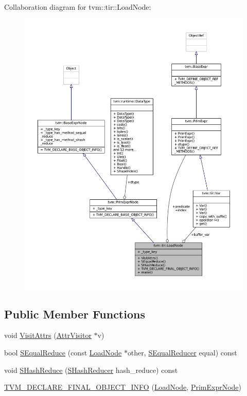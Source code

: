 Collaboration diagram for tvm\+:\+:tir\+:\+:Load\+Node\+:
\nopagebreak
\begin{figure}[H]
\begin{center}
\leavevmode
\includegraphics[width=350pt]{classtvm_1_1tir_1_1LoadNode__coll__graph}
\end{center}
\end{figure}
\subsection*{Public Member Functions}
\begin{DoxyCompactItemize}
\item 
void \hyperlink{classtvm_1_1tir_1_1LoadNode_acc4597323aba2761dafaf9a24bb4c0e4}{Visit\+Attrs} (\hyperlink{classtvm_1_1AttrVisitor}{Attr\+Visitor} $\ast$v)
\item 
bool \hyperlink{classtvm_1_1tir_1_1LoadNode_adbc71528163b57582a742224be58d15c}{S\+Equal\+Reduce} (const \hyperlink{classtvm_1_1tir_1_1LoadNode}{Load\+Node} $\ast$other, \hyperlink{classtvm_1_1SEqualReducer}{S\+Equal\+Reducer} equal) const 
\item 
void \hyperlink{classtvm_1_1tir_1_1LoadNode_afb58f71fc73372de53d375c03d178dba}{S\+Hash\+Reduce} (\hyperlink{classtvm_1_1SHashReducer}{S\+Hash\+Reducer} hash\+\_\+reduce) const 
\item 
\hyperlink{classtvm_1_1tir_1_1LoadNode_a4f612c08468ab2cf9e297b4e34a42d29}{T\+V\+M\+\_\+\+D\+E\+C\+L\+A\+R\+E\+\_\+\+F\+I\+N\+A\+L\+\_\+\+O\+B\+J\+E\+C\+T\+\_\+\+I\+N\+FO} (\hyperlink{classtvm_1_1tir_1_1LoadNode}{Load\+Node}, \hyperlink{classtvm_1_1PrimExprNode}{Prim\+Expr\+Node})
\end{DoxyCompactItemize}
